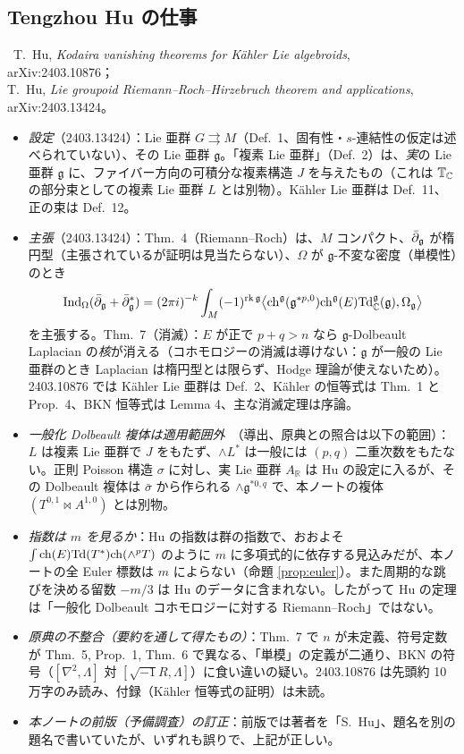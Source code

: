 \subsection{Tengzhou Hu の仕事}
\tC\ T.\ Hu, \emph{Kodaira vanishing theorems for K\"ahler Lie algebroids}, arXiv:2403.10876；\\ T.\ Hu, \emph{Lie groupoid Riemann--Roch--Hirzebruch theorem and applications}, arXiv:2403.13424。
\begin{itemize}
\item \emph{設定}（2403.13424）：Lie 亜群 $G\rightrightarrows M$（Def.\ 1、固有性・$s$-連結性の仮定は述べられていない）、その Lie 亜群 $\mathfrak g$。「複素 Lie 亜群」（Def.\ 2）は、\emph{実}の Lie 亜群 $\mathfrak g$ に、ファイバー方向の可積分な複素構造 $J$ を与えたもの（これは $\mathbb T_\mathbb C$ の部分束としての複素 Lie 亜群 $L$ とは別物）。Kähler Lie 亜群は Def.\ 11、正の束は Def.\ 12。
\item \emph{主張}（2403.13424）：Thm.\ 4（Riemann--Roch）は、$M$ コンパクト、$\bar\partial_{\mathfrak g}$ が楕円型（主張されているが証明は見当たらない）、$\Omega$ が $\mathfrak g$-不変な密度（単模性）のとき
\[\mathrm{Ind}_\Omega(\bar\partial_{\mathfrak g}+\bar\partial_{\mathfrak g}^*)=(2\pi i)^{-k}\int_M(-1)^{\mathrm{rk}\,\mathfrak g}\bigl\langle\mathrm{ch}^{\mathfrak g}(\mathfrak g^{*p,0})\mathrm{ch}^{\mathfrak g}(E)\mathrm{Td}^{\mathfrak g}_\mathbb C(\mathfrak g),\Omega_{\mathfrak g}\bigr\rangle\]
を主張する。Thm.\ 7（消滅）：$E$ が正で $p+q>n$ なら $\mathfrak g$-Dolbeault Laplacian の\emph{核}が消える（コホモロジーの消滅は導けない：$\mathfrak g$ が一般の Lie 亜群のとき Laplacian は楕円型とは限らず、Hodge 理論が使えないため）。2403.10876 では Kähler Lie 亜群は Def.\ 2、Kähler の恒等式は Thm.\ 1 と Prop.\ 4、BKN 恒等式は Lemma 4、主な消滅定理は序論。
\item \emph{一般化 Dolbeault 複体は適用範囲外}\tP\ （導出、原典との照合は以下の範囲）：$L$ は複素 Lie 亜群で $J$ をもたず、$\wedge L^*$ は一般には $(p,q)$ 二重次数をもたない。正則 Poisson 構造 $\sigma$ に対し、実 Lie 亜群 $A_{\mathbb R}$ は Hu の設定に入るが、その Dolbeault 複体は $\bar\sigma$ から作られる $\wedge\mathfrak g^{*0,q}$ で、本ノートの複体 $(T^{0,1}\bowtie A^{1,0})$ とは別物。
\item \emph{指数は $m$ を見るか}\tK：Hu の指数は群の指数で、おおよそ $\int\mathrm{ch}(E)\mathrm{Td}(T^*)\mathrm{ch}(\wedge^pT)$ のように $m$ に多項式的に依存する見込みだが、本ノートの全 Euler 標数は $m$ によらない（命題 \ref{prop:euler}）。また周期的な跳びを決める留数 $-m/3$ は Hu のデータに含まれない。したがって Hu の定理は「一般化 Dolbeault コホモロジーに対する Riemann--Roch」ではない。
\item \emph{原典の不整合（要約を通して得たもの）}：Thm.\ 7 で $n$ が未定義、符号定数が Thm.\ 5, Prop.\ 1, Thm.\ 6 で異なる、「単模」の定義が二通り、BKN の符号（$[\nabla^2,\Lambda]$ 対 $[\sqrt{-1}R,\Lambda]$）に食い違いの疑い。2403.10876 は先頭約 10 万字のみ読み、付録（Kähler 恒等式の証明）は未読。\tQ
\item \emph{本ノートの前版（予備調査）の訂正}：前版では著者を「S.\ Hu」、題名を別の題名で書いていたが、いずれも誤りで、上記が正しい。
\end{itemize}

